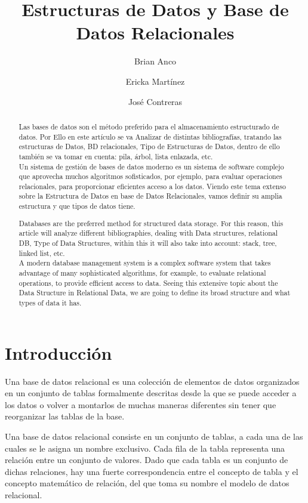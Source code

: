 \documentclass{article}
\title{\textbf{Estructuras de Datos y Base de Datos Relacionales}}
\author[1]{Brian Anco}
\author[2]{Ericka Martínez}
\author[3]{José Contreras}
\affil[1]{Universidad Privada de Tacna, Perú. Email: briancoc@upt.pe}
\affil[2]{Universidad Privada de Tacna, Perú. Email: erimartinezy@upt.pe}
\affil[3]{Universidad Privada de Tacna, Perú. Email: joscontrerasm@upt.pe}
\date{}
\begin{document}
\maketitle

\begin{abstract}
    Las bases de datos son el método preferido para el almacenamiento estructurado de datos. Por Ello en este artículo se va Analizar de distintas bibliografías, tratando las estructuras de Datos, BD relacionales, Tipo de Estructuras de Datos, dentro de ello también se va tomar en cuenta: pila, árbol, lista enlazada, etc.\\Un sistema de gestión de bases de datos moderno es un sistema de software complejo que aprovecha muchos algoritmos sofisticados, por ejemplo, para evaluar operaciones relacionales, para proporcionar eficientes acceso a los datos. Viendo este tema extenso sobre la Estructura de Datos en base de Datos Relacionales, vamos definir su  amplia estructura y que tipos de datos tiene. 
\end{abstract}

\begin{abstract}
Databases are the preferred method for structured data storage. For this reason, this article will analyze different bibliographies, dealing with Data structures, relational DB, Type of Data Structures, within this it will also take into account: stack, tree, linked list, etc.\\A modern database management system is a complex software system that takes advantage of many sophisticated algorithms, for example, to evaluate relational operations, to provide efficient access to data. Seeing this extensive topic about the Data Structure in Relational Data, we are going to define its broad structure and what types of data it has.    
\end{abstract}


\section{Introducción}
Una base de datos relacional es una colección de elementos de datos organizados en un conjunto de tablas formalmente descritas desde la que se puede acceder a los datos o volver a montarlos de muchas maneras diferentes sin tener que reorganizar las tablas de la base.  

Una base de datos relacional consiste en un conjunto de tablas, a cada una de las cuales se le asigna un nombre exclusivo. Cada fila de la tabla representa una relación entre un conjunto de valores. Dado que cada tabla es un conjunto de dichas relaciones, hay una fuerte correspondencia entre el concepto de tabla y el concepto matemático de relación, del que toma su nombre el modelo de datos relacional. 
\newpage
\end{document}
